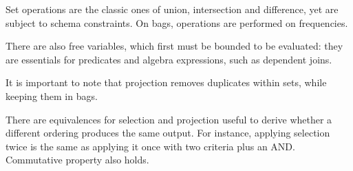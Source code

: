 Set operations are the classic ones of union, intersection and difference, yet are subject to schema constraints. On bags, operations are performed on frequencies. 

There are also free variables, which first must be bounded to be evaluated: they are essentials for predicates and algebra expressions, such as dependent joins. 

It is important to note that projection removes duplicates within sets, while keeping them in bags.

There are equivalences for selection and projection useful to derive whether a different ordering produces the same output. For instance, applying selection twice is the same as applying it once with two criteria plus an AND. Commutative property also holds.


